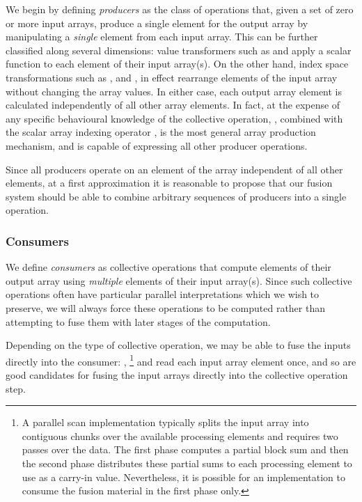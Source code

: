 We begin by defining \emph{producers} as the class of operations
that, given a set of zero or more input arrays, produce a single element for the
output array by manipulating a \emph{single} element from each input array. This
can be further classified along several dimensions: value transformers such as
 and  apply a scalar function to each element of their
input array(s). On the other hand, index space transformations such as
,  and , in effect rearrange
elements of the input array without changing the array values. In either case,
each output array element is calculated independently of all other array
elements. In fact, at the expense of any specific behavioural knowledge of the
collective operation, , combined with the scalar array indexing
operator \code{(!)}, is the most general array production mechanism, and is
capable of expressing all other producer operations.

Since all producers operate on an element of the array independent of all other
elements, at a first approximation it is reasonable to propose that our fusion
system should be able to combine arbitrary sequences of producers into a single
operation.


\subsubsection{Consumers}

We define \emph{consumers} as collective operations that compute
elements of their output array using \emph{multiple} elements of their input
array(s). Since such collective operations often have particular parallel
interpretations which we wish to preserve, we will always force these operations
to be computed rather than attempting to fuse them with later stages of the
computation.

Depending on the type of collective operation, we may be able to fuse the inputs
directly into the consumer: , \footnote{A parallel
scan implementation typically splits the input array into contiguous chunks over
the available processing elements and requires two passes over the data. The
first phase computes a partial block sum and then the second phase distributes
these partial sums to each processing element to use as a carry-in value.
Nevertheless, it is possible for an implementation to consume the fusion
material in the first phase only.} and  read each input array
element once, and so are good candidates for fusing the input arrays directly
into the collective operation step.

